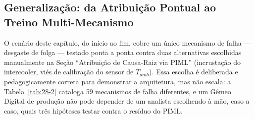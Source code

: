 \documentclass[12pt,a4paper]{article}
\numberwithin{equation}{section}
\numberwithin{table}{section}
\numberwithin{figure}{section}
\begin{document}
\begin{table}[h!tbp]
	\centering
	\caption[Fluxo de dados do estudo de caso integrado]{Fluxo de dados do estudo de caso integrado — cada linha alimenta a próxima, do modelo físico à decisão prescritiva.}
	\label{tab:29-2}
\end{table}

\subsection{Generalização: da Atribuição Pontual ao Treino Multi-Mecanismo}

O cenário deste capítulo, do início ao fim, cobre um único mecanismo de falha — desgaste de folga — testado ponta a ponta contra duas alternativas escolhidas manualmente na Seção ``Atribuição de Causa-Raiz via PIML'' (incrustação do intercooler, viés de calibração do sensor de $T_{amb}$). Essa escolha é deliberada e pedagogicamente correta para demonstrar a arquitetura, mas não escala: a Tabela~\ref{tab:28-2} cataloga 59 mecanismos de falha diferentes, e um Gêmeo Digital de produção não pode depender de um analista escolhendo à mão, caso a caso, quais três hipóteses testar contra o resíduo do PIML.
\end{document}
